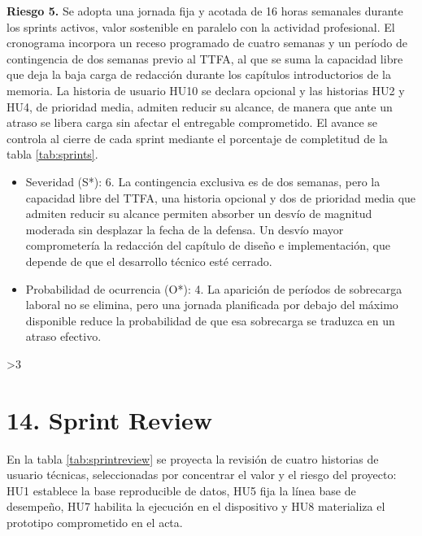 \documentclass[
11pt, %
]{charter}
\providecommand{\revision}{1}
\begin{document}
\textbf{Riesgo 5.} Se adopta una jornada fija y acotada de 16 horas semanales durante los sprints activos, valor sostenible en paralelo con la actividad profesional. El cronograma incorpora un receso programado de cuatro semanas y un período de contingencia de dos semanas previo al TTFA, al que se suma la capacidad libre que deja la baja carga de redacción durante los capítulos introductorios de la memoria. La historia de usuario HU10 se declara opcional y las historias HU2 y HU4, de prioridad media, admiten reducir su alcance, de manera que ante un atraso se libera carga sin afectar el entregable comprometido. El avance se controla al cierre de cada sprint mediante el porcentaje de completitud de la tabla \ref{tab:sprints}.
\begin{itemize}
    \item Severidad (S*): 6. La contingencia exclusiva es de dos semanas, pero la capacidad libre del TTFA, una historia opcional y dos de prioridad media que admiten reducir su alcance permiten absorber un desvío de magnitud moderada sin desplazar la fecha de la defensa. Un desvío mayor comprometería la redacción del capítulo de diseño e implementación, que depende de que el desarrollo técnico esté cerrado.
    \item Probabilidad de ocurrencia (O*): 4. La aparición de períodos de sobrecarga laboral no se elimina, pero una jornada planificada por debajo del máximo disponible reduce la probabilidad de que esa sobrecarga se traduzca en un atraso efectivo.
\end{itemize}
\else\fi

\ifnum\revision>3
\section{14. Sprint Review}
\label{sec:sprint_review}

En la tabla \ref{tab:sprintreview} se proyecta la revisión de cuatro historias de usuario técnicas, seleccionadas por concentrar el valor y el riesgo del proyecto: HU1 establece la base reproducible de datos, HU5 fija la línea base de desempeño, HU7 habilita la ejecución en el dispositivo y HU8 materializa el prototipo comprometido en el acta.
\end{document}
